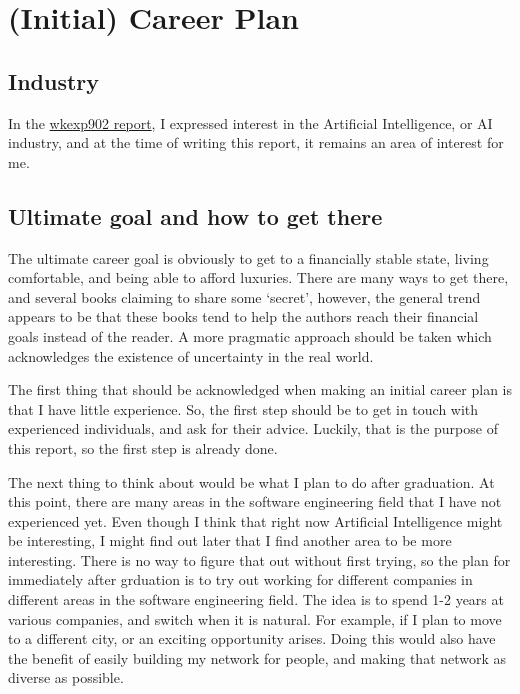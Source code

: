 \section{(Initial) Career Plan}

\subsection{Industry}
In the
\href{https://github.com/Arunscape/LaTeX-Stuff/blob/a732f319e8a6526f036bd424fa24f66941f09a5a/Work-Term-Reports/wkexp902/report.pdf}{wkexp902
report}, 
I expressed interest in the Artificial Intelligence, or AI industry, and at the
time of writing this report, it remains an area of interest for me. 


\subsection{Ultimate goal and how to get there}
The ultimate career goal is obviously to get to a financially stable state,
living comfortable, and being able to afford luxuries. There are many ways to
get there, and several books claiming to share some `secret', however, the
general trend appears to be that these books tend to help the authors reach
their financial goals instead of the reader. A more pragmatic approach should be
taken which acknowledges the existence of uncertainty in the real world. 

The first thing that should be acknowledged when making an initial career plan
is that I have little experience. So, the first step should be to get in touch
with experienced individuals, and ask for their advice. Luckily, that is the
purpose of this report, so the first step is already done.

The next thing to think about would be what I plan to do after graduation.
At this point, there are many areas in the software engineering field that I 
have not experienced yet. Even though I think that right now Artificial
Intelligence might be interesting, I might find out later that I find another
area to be more interesting. There is no way to figure that out without first
trying, so the plan for immediately after grduation is to try out working for
different companies in different areas in the software engineering field. 
The idea is to spend 1-2 years at various companies, and switch when it is
natural. For example, if I plan to move to a different city, or an exciting
opportunity arises. Doing this would also have the benefit of easily building
my network for people, and making that network as diverse as possible.

